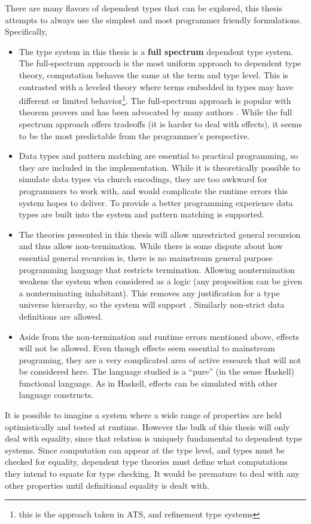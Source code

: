 There are many flavors of dependent types that can be explored, this thesis attempts to always use the simplest and most programmer friendly formulations.
Specifically,
\begin{itemize}
\item The type system in this thesis is a \textbf{full spectrum} dependent type system.
The full-spectrum approach is the most uniform approach to dependent type theory, computation behaves the same at the term and type level.
This is contrasted with a leveled theory where terms embedded in types may have different or limited behavior\footnote{this is the approach taken in ATS, and refinement type systems}.
The full-spectrum approach is popular with theorem provers and has been advocated by many authors \cite{10.1145/289423.289451,norell2007towards,brady2013idris,sjoberg2012irrelevance}.
While the full spectrum approach offers tradeoffs (it is harder to deal with effects), it seems to be the most predictable from the programmer's perspective.
\item Data types and pattern matching are essential to practical programming, so they are included in the implementation.
While it is theoretically possible to simulate data types via church encodings, they are too awkward for programmers to work with, and would complicate the runtime errors this system hopes to deliver.
To provide a better programming experience data types are built into the system and pattern matching is supported.
\item The theories presented in this thesis will allow unrestricted general recursion and thus allow non-termination.
While there is some dispute about how essential general recursion is,
there is no mainstream general purpose programming language that restricts termination.
Allowing nontermination weakens the system when considered as a logic (any proposition can be given a nonterminating inhabitant).
This removes any justification for a type universe hierarchy, so the system will support \tit{}.
Similarly non-strict data definitions are allowed.
\item Aside from the non-termination and runtime errors mentioned above, effects will not be allowed.
Even though effects seem essential to mainstream programing, they are a very complicated area of active research that will not be considered here.
The language studied is a ``pure'' (in the sense  Haskell) functional language.
As in Haskell, effects can be simulated with other language constructs.
\end{itemize}
It is possible to imagine a system where a wide range of properties are held optimistically and tested at runtime.
However the bulk of this thesis will only deal with equality, since that relation is uniquely fundamental to dependent type systems.
Since computation can appear at the type level, and types must be checked for equality, dependent type theories must define what computations they intend to equate for type checking.
It would be premature to deal with any other properties until definitional equality is dealt with.

